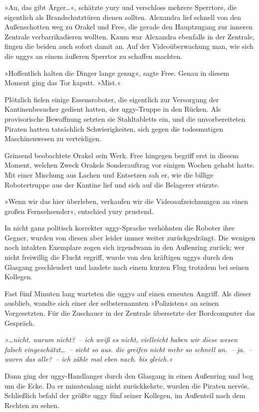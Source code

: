 »Au, das gibt Ärger…«, schätzte yury und verschloss mehrere Sperrtore, die eigentlich als Brandschutztüren dienen sollten. Alexandra lief schnell von den Außenschotten weg zu Orakel und Free, die gerade den Hauptzugang zur inneren Zentrale verbarrikadieren wollten. Kaum war Alexandra ebenfalls in der Zentrale, fingen die beiden auch sofort damit an. Auf der Videoüberwachung man, wie sich die uggys an einem äußeren Sperrtor zu schaffen machten.

»Hoffentlich halten die Dinger lange genug«, sagte Free. Genau in diesem Moment ging das Tor kaputt. »Mist.«

Plötzlich fielen einige Essensroboter, die eigentlich zur Versorgung der Kantinenbesucher gedient hatten, der uggy-Truppe in den Rücken. Als provisorische Bewaffnung setzten sie Stahltabletts ein, und die unvorbereiteten Piraten hatten tatsächlich Schwierigkeiten, sich gegen die todesmutigen Maschinenwesen zu verteidigen.

Grinsend beobachtete Orakel sein Werk. Free hingegen begriff erst in diesem Moment, welchen Zweck Orakels Sonderauftrag vor einigen Wochen gehabt hatte. Mit einer Mischung aus Lachen und Entsetzen sah er, wie die billige Robotertruppe aus der Kantine lief und sich auf die Belagerer stürzte.

»Wenn wir das hier überleben, verkaufen wir die Videoaufzeichnungen an einen großen Fernsehsender«, entschied yury prustend.

In nicht ganz politisch korrekter uggy-Sprache verhöhnten die Roboter ihre Gegner, wurden von diesen aber leider immer weiter zurückgedrängt. Die wenigen noch intakten Exemplare zogen sich irgendwann in den Außenring zurück; wer nicht freiwillig die Flucht ergriff, wurde von den kräftigen uggys durch den Glasgang geschleudert und landete nach einem kurzen Flug trotzdem bei seinen Kollegen.

Fast fünf Minuten lang warteten die uggys auf einen erneuten Angriff. Als dieser ausblieb, wandte sich einer der selbsternannten »Polizisten« an seinen Vorgesetzten. Für die Zuschauer in der Zentrale übersetzte der Bordcomputer das Gespräch.

\textit{»…nicht. warum nicht?~– ich weiß es nicht, vielleicht haben wir diese wesen falsch eingeschätzt…~– sieht so aus. die greifen nicht mehr so schnell an.~– ja.~– waren das alle?~– ich zähle mal eben nach. bis gleich.«}

Dann ging der uggy-Handlanger durch den Glasgang in einen Außenring und bog um die Ecke. Da er minutenlang nicht zurückkehrte, wurden die Piraten nervös. Schließlich befahl der größte uggy fünf seiner Kollegen, im Außenteil nach dem Rechten zu sehen.

